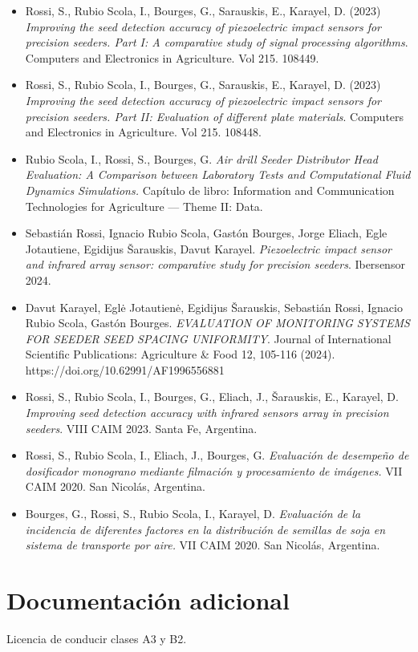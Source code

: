 \documentclass[11pt,a4paper]{article}
\begin{document}
\begin{itemize}[leftmargin=0.5cm, noitemsep]
    \item Rossi, S., Rubio Scola, I., Bourges, G., Sarauskis, E., Karayel, D. (2023) \textit{Improving the seed detection accuracy of piezoelectric impact sensors for precision seeders. Part I: A comparative study of signal processing algorithms}. Computers and Electronics in Agriculture. Vol 215. 108449.
    \item Rossi, S., Rubio Scola, I., Bourges, G., Sarauskis, E., Karayel, D. (2023) \textit{Improving the seed detection accuracy of piezoelectric impact sensors for precision seeders. Part II: Evaluation of different plate materials}. Computers and Electronics in Agriculture. Vol 215. 108448.
    \item Rubio Scola, I., Rossi, S., Bourges, G. \textit{Air drill Seeder Distributor Head Evaluation: A Comparison between Laboratory Tests and Computational Fluid Dynamics Simulations.} Capítulo de libro: Information and Communication Technologies for Agriculture — Theme II: Data.
    \item Sebastián Rossi, Ignacio Rubio Scola, Gastón Bourges, Jorge Eliach, Egle Jotautiene, Egidijus Šarauskis, Davut Karayel. \textit{Piezoelectric impact sensor and infrared array sensor: comparative study for precision seeders}. Ibersensor 2024.
    \item Davut Karayel, Eglė Jotautienė, Egidijus Šarauskis, Sebastián Rossi, Ignacio Rubio Scola, Gastón Bourges. \textit{EVALUATION OF MONITORING SYSTEMS FOR SEEDER SEED SPACING UNIFORMITY}. Journal of International Scientific Publications: Agriculture \& Food 12, 105-116 (2024). https://doi.org/10.62991/AF1996556881
    \item Rossi, S., Rubio Scola, I., Bourges, G., Eliach, J., Šarauskis, E., Karayel, D. \textit{Improving seed detection accuracy with infrared sensors array in precision seeders}. VIII CAIM 2023. Santa Fe, Argentina.
    \item Rossi, S., Rubio Scola, I., Eliach, J., Bourges, G. \textit{Evaluación de desempeño de dosificador monograno mediante filmación y procesamiento de imágenes.} VII CAIM 2020. San Nicolás, Argentina.
    \item Bourges, G., Rossi, S., Rubio Scola, I., Karayel, D. \textit{Evaluación de la incidencia de diferentes factores en la distribución de semillas de soja en sistema de transporte por aire.} VII CAIM 2020. San Nicolás, Argentina.
\end{itemize}

\section{Documentación adicional}
Licencia de conducir clases A3 y B2.
\end{document}
